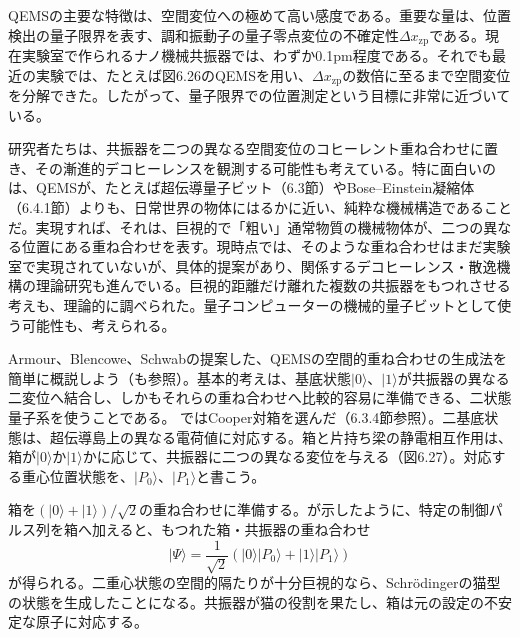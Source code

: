 QEMSの主要な特徴は、空間変位への極めて高い感度である。重要な量は、位置検出の量子限界を表す、調和振動子の量子零点変位の不確定性$\Delta x_{\mathrm{zp}}$である。現在実験室で作られるナノ機械共振器では、わずか0.1pm程度である\cite{ref307}。それでも最近の実験では、たとえば図6.26のQEMSを用い、$\Delta x_{\mathrm{zp}}$の数倍に至るまで空間変位を分解できた\cite{ref310}。したがって、量子限界での位置測定という目標に非常に近づいている。

研究者たちは、共振器を二つの異なる空間変位のコヒーレント重ね合わせに置き、その漸進的デコヒーレンスを観測する可能性も考えている。特に面白いのは、QEMSが、たとえば超伝導量子ビット（6.3節）やBose--Einstein凝縮体（6.4.1節）よりも、日常世界の物体にはるかに近い、純粋な機械構造であることだ。実現すれば、それは、巨視的で「粗い」通常物質の機械物体が、二つの異なる位置にある重ね合わせを表す。現時点では、そのような重ね合わせはまだ実験室で実現されていないが、具体的提案\cite{ref312}があり、関係するデコヒーレンス・散逸機構の理論研究も進んでいる\cite{ref242,ref313,ref314,ref315}。巨視的距離だけ離れた複数の共振器をもつれさせる考えも、理論的に調べられた\cite{ref316}。量子コンピューターの機械的量子ビットとして使う可能性も、考えられる\cite{ref317}。

Armour、Blencowe、Schwab\cite{ref312}の提案した、QEMSの空間的重ね合わせの生成法を簡単に概説しよう（\cite{ref307}も参照）。基本的考えは、基底状態$|0\rangle$、$|1\rangle$が共振器の異なる二変位へ結合し、しかもそれらの重ね合わせへ比較的容易に準備できる、二状態量子系を使うことである。
\hypertarget{srcpage:286}{}\label{srcpage:286}
\cite{ref312}ではCooper対箱を選んだ（6.3.4節参照）。二基底状態は、超伝導島上の異なる電荷値に対応する。箱と片持ち梁の静電相互作用は、箱が$|0\rangle$か$|1\rangle$かに応じて、共振器に二つの異なる変位を与える（図6.27）。対応する重心位置状態を、$|P_0\rangle$、$|P_1\rangle$と書こう。

箱を$(|0\rangle+|1\rangle)/\sqrt2$の重ね合わせに準備する。\cite{ref312}が示したように、特定の制御パルス列を箱へ加えると、もつれた箱・共振器の重ね合わせ
\begin{equation}|\Psi\rangle=\frac1{\sqrt2}(|0\rangle|P_0\rangle+|1\rangle|P_1\rangle)\tag{6.37}\end{equation}
が得られる。二重心状態の空間的隔たりが十分巨視的なら、Schrödingerの猫型の状態を生成したことになる。共振器が猫の役割を果たし、箱は元の設定の不安定な原子に対応する。

